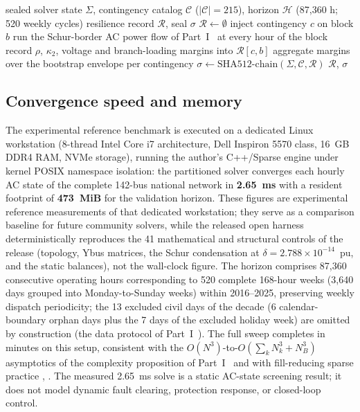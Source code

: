 \begin{algorithm}[!t]
\caption{$N$--$1$ resilience sweep with 24-hour block bootstrap and SHA-512 sealing}
\label{alg:n1_seal}
\begin{algorithmic}[1]
\Require sealed solver state $\Sigma$, contingency catalog $\mathcal{C}$
         ($|\mathcal{C}| = 215$), horizon $\mathcal{H}$ (87,360 h; 520 weekly cycles)
\Ensure resilience record $\mathcal{R}$, seal $\sigma$
\State $\mathcal{R} \gets \emptyset$
 
    
      \State inject contingency $c$ on block $b$
      \State run the Schur-border AC power flow of Part~I~\cite{seni142part1} at every hour of the block
      \State record $\rho$, $\kappa_2$, voltage and branch-loading margins into $\mathcal{R}[c, b]$
   \EndFor
\EndFor
\State aggregate margins over the bootstrap envelope per contingency
\State $\sigma \gets \mathrm{SHA512}\text{-chain}(\Sigma, \mathcal{C}, \mathcal{R})$ 
\State \Return $\mathcal{R}$, $\sigma$
\end{algorithmic}
\end{algorithm}

\subsection{Convergence speed and memory}
\label{sub:speed}

The experimental reference benchmark is executed on a dedicated Linux workstation (8-thread Intel Core i7 architecture, Dell Inspiron 5570 class, 16~GB DDR4 RAM, NVMe storage), running the author's C++/Sparse engine under kernel POSIX namespace isolation: the partitioned solver converges each hourly AC state of the complete 142-bus national network in \textbf{2.65~ms} with a resident footprint of \textbf{473~MiB} for the validation horizon. These figures are experimental reference measurements of that dedicated workstation; they serve as a comparison baseline for future community solvers, while the released open harness deterministically reproduces the 41 mathematical and structural controls of the release (topology, Ybus matrices, the Schur condensation at $\delta = 2.788 \times 10^{-14}$~pu, and the static balances), not the wall-clock figure. The horizon comprises 87,360 consecutive operating hours corresponding to 520 complete 168-hour weeks (3,640 days grouped into Monday-to-Sunday weeks) within 2016--2025, preserving weekly dispatch periodicity; the 13 excluded civil days of the decade (6 calendar-boundary orphan days plus the 7 days of the excluded holiday week) are omitted by construction (the data protocol of Part~I~\cite{seni142part1}). The full sweep completes in minutes on this setup, consistent with the $O(N^3)$-to-$O(\sum_k N_k^3 + N_B^3)$ asymptotics of the complexity proposition of Part~I~\cite{seni142part1} and with fill-reducing sparse practice \cite{george1973}, \cite{saad2003}. The measured 2.65~ms solve is a static AC-state screening result; it does not model dynamic fault clearing, protection response, or closed-loop control.

